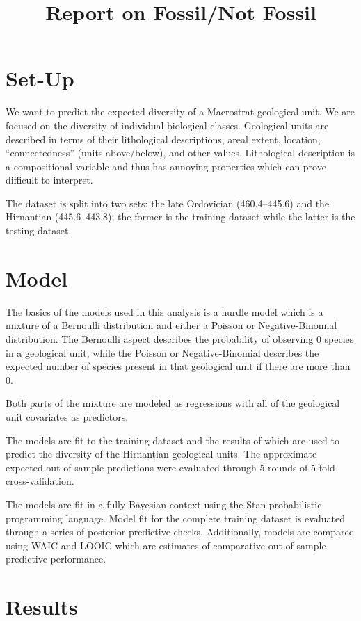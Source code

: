\documentclass[12pt,letterpaper]{article}
\title{Report on Fossil/Not Fossil}
\begin{document}
\maketitle

\section{Set-Up}

We want to predict the expected diversity of a Macrostrat geological unit. We are focused on the diversity of individual biological classes. Geological units are described in terms of their lithological descriptions, areal extent, location, ``connectedness'' (units above/below), and other values. Lithological description is a compositional variable and thus has annoying properties which can prove difficult to interpret. 

The dataset is split into two sets: the late Ordovician (460.4--445.6) and the Hirnantian (445.6--443.8); the former is the training dataset while the latter is the testing dataset.


\section{Model}

The basics of the models used in this analysis is a hurdle model which is a mixture of a Bernoulli distribution and either a Poisson or Negative-Binomial distribution. The Bernoulli aspect describes the probability of observing 0 species in a geological unit, while the Poisson or Negative-Binomial describes the expected number of species present in that geological unit if there are more than 0.

Both parts of the mixture are modeled as regressions with all of the geological unit covariates as predictors.

The models are fit to the training dataset and the results of which are used to predict the diversity of the Hirnantian geological units. The approximate expected out-of-sample predictions were evaluated through 5 rounds of 5-fold cross-validation.

The models are fit in a fully Bayesian context using the Stan probabilistic programming language. Model fit for the complete training dataset is evaluated through a series of posterior predictive checks. Additionally, models are compared using WAIC and LOOIC which are estimates of comparative out-of-sample predictive performance.


\section{Results}
\end{document}
